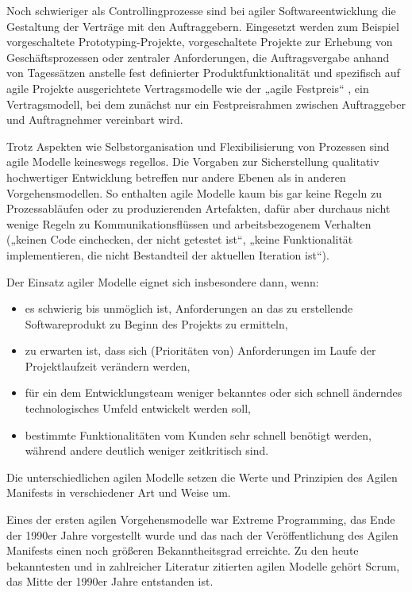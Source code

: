 Noch schwieriger als Controllingprozesse sind bei agiler Softwareentwicklung die Gestaltung der Verträge mit den Auftraggebern. Eingesetzt werden zum Beispiel vorgeschaltete Prototyping-Projekte, vorgeschaltete Projekte zur Erhebung von Geschäftsprozessen oder zentraler Anforderungen, die Auftragsvergabe anhand von Tagessätzen anstelle fest definierter Produktfunktionalität und spezifisch auf agile Projekte ausgerichtete Vertragsmodelle wie der „agile Festpreis“ \cite{ope18}, ein Vertragsmodell, bei dem zunächst nur ein Festpreisrahmen zwischen Auftraggeber und Auftragnehmer vereinbart wird.

Trotz Aspekten wie Selbstorganisation und Flexibilisierung von Prozessen sind agile Modelle keineswegs regellos. Die Vorgaben zur Sicherstellung qualitativ hochwertiger Entwicklung betreffen nur andere Ebenen als in anderen Vorgehensmodellen. So enthalten agile Modelle kaum bis gar keine Regeln zu Prozessabläufen oder zu produzierenden Artefakten, dafür aber durchaus nicht wenige Regeln zu Kommunikationsflüssen und arbeitsbezogenem Verhalten (\zb „keinen Code einchecken, der nicht getestet ist“, „keine Funktionalität implementieren, die nicht Bestandteil der aktuellen Iteration ist“). 

Der Einsatz agiler Modelle eignet sich insbesondere dann, wenn:

\begin{itemize}
	\item es schwierig bis unmöglich ist, Anforderungen an das zu erstellende Softwareprodukt zu Beginn des Projekts zu ermitteln, 
	\item zu erwarten ist, dass sich (Prioritäten von) Anforderungen im Laufe der Projektlaufzeit verändern werden,
	\item für ein dem Entwicklungsteam weniger bekanntes oder sich schnell änderndes technologisches Umfeld entwickelt werden soll,
	\item bestimmte Funktionalitäten vom Kunden sehr schnell benötigt werden, während andere deutlich weniger zeitkritisch sind.
\end{itemize}

Die unterschiedlichen agilen Modelle setzen die Werte und Prinzipien des Agilen Manifests in verschiedener Art und Weise um. 
   
Eines der ersten agilen Vorgehensmodelle war Extreme Programming, das Ende der 1990er Jahre vorgestellt wurde und das nach der Veröffentlichung des Agilen Manifests einen noch größeren Bekanntheitsgrad erreichte. Zu den heute bekanntesten und in zahlreicher Literatur zitierten agilen Modelle gehört Scrum, das Mitte der 1990er Jahre entstanden ist.